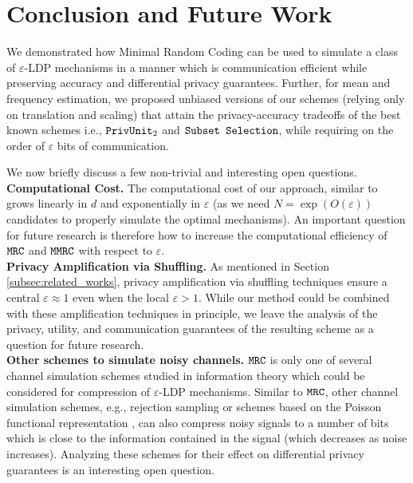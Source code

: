 \section{Conclusion and Future Work}
\label{sec:conclusion}
We demonstrated how Minimal Random Coding can be used to simulate a class of $\varepsilon$-LDP mechanisms in a manner which is communication efficient while preserving accuracy and differential privacy guarantees. Further, for mean and frequency estimation, we proposed unbiased versions of our schemes (relying only on translation and scaling) that attain the privacy-accuracy tradeoffs of the best known schemes i.e., $\texttt{PrivUnit}_2$ and $\texttt{Subset Selection}$, while requiring on the order of $\varepsilon$ bits of communication.

We now briefly discuss a few non-trivial and interesting open questions. \\

\noindent\textbf{Computational Cost.} The computational cost of our approach, similar to \cite{FT21} grows linearly in $d$ and exponentially in $\varepsilon$ (as we need $N = \exp(O(\varepsilon))$ candidates to properly simulate the optimal mechanisms). An important question for future research is therefore how to increase the computational efficiency of $\texttt{MRC}$ and $\texttt{MMRC}$ with respect to $\varepsilon$.\\

\noindent\textbf{Privacy Amplification via Shuffling.} As mentioned in Section \ref{subsec:related_works}, privacy amplification via shuffling techniques ensure a central $\varepsilon \approx 1$ even when the local $\varepsilon >1$. While our method could be combined with these amplification techniques in principle, we leave the analysis of the privacy, utility, and communication guarantees of the resulting scheme as a question for future research.\\

\noindent\textbf{Other schemes to simulate noisy channels.} $\texttt{MRC}$ is only one of several channel simulation schemes studied in information theory which could be considered for compression of $\varepsilon$-LDP mechanisms. 
Similar to $\texttt{MRC}$, other channel simulation schemes, e.g., rejection sampling \citep{HJMR07} or schemes based on the Poisson functional representation \citep{LE18}, can also compress noisy signals to a number of bits which is close to the information contained in the signal (which decreases as noise increases). 
Analyzing these schemes for their effect on differential privacy guarantees is an interesting open question.\\

